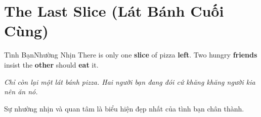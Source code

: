 \section{The Last Slice (Lát Bánh Cuối Cùng)}
\begin{truyen}{Tình Bạn}{Nhường Nhịn}
There is only one \textbf{slice} of pizza \textbf{left}. Two hungry \textbf{friends} insist the \textbf{other} should \textbf{eat} it.

\textit{Chỉ còn lại một lát bánh pizza. Hai người bạn đang đói cứ khăng khăng người kia nên ăn nó.}

\begin{baihoc}
Sự nhường nhịn và quan tâm là biểu hiện đẹp nhất của tình bạn chân thành.
\end{baihoc}
\end{truyen}
